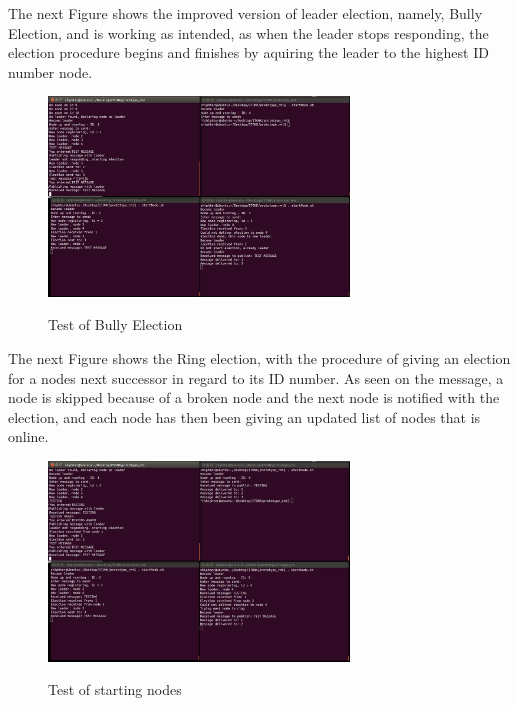 \newpage

The next Figure shows the improved version of leader election, namely, Bully Election, and is working as intended, as when the leader stops responding, the election procedure begins and finishes by aquiring the leader to the highest ID number node.

\begin{figure}[ht!]
\centering
\caption{Test of Bully Election}
\includegraphics[width=80mm]{img/bully_election_messages.png}
\label{Test of Bully Election}
\end{figure}

The next Figure shows the Ring election, with the procedure of giving an election for a nodes next successor in regard to its ID number. As seen on the message, a node is skipped because of a broken node and the next node is notified with the election, and each node has then been giving an updated list of nodes that is online.

\begin{figure}[ht!]
\centering
\caption{Test of starting nodes}
\includegraphics[width=80mm]{img/ring_election_messages.png}
\label{Test of Ring Election}
\end{figure}











